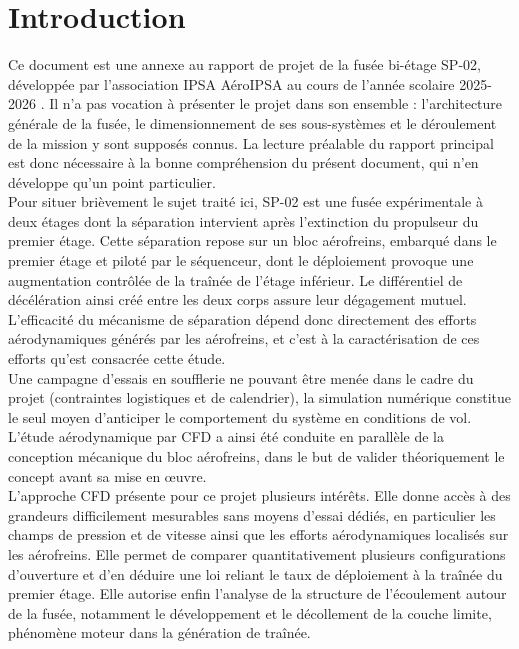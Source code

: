 \section*{Introduction}

Ce document est une annexe au rapport de projet de la fusée bi-étage SP-02, développée par l'association \acrshort{IPSA} AéroIPSA
au cours de l'année scolaire 2025-2026 \cite{rapportSP02}. Il n'a pas vocation à présenter le projet dans son ensemble :
l'architecture générale de la fusée, le dimensionnement de ses sous-systèmes et le déroulement de la mission y sont supposés
connus. La lecture préalable du rapport principal est donc nécessaire à la bonne compréhension du présent document, qui n'en
développe qu'un point particulier.\\

Pour situer brièvement le sujet traité ici, SP-02 est une fusée expérimentale à deux étages dont la séparation intervient après
l'extinction du propulseur du premier étage. Cette séparation repose sur un bloc aérofreins, embarqué dans le premier étage et
piloté par le séquenceur, dont le déploiement provoque une augmentation contrôlée de la traînée de l'étage inférieur. Le
différentiel de décélération ainsi créé entre les deux corps assure leur dégagement mutuel. L'efficacité du mécanisme de
séparation dépend donc directement des efforts aérodynamiques générés par les aérofreins, et c'est à la caractérisation de ces
efforts qu'est consacrée cette étude.\\

Une campagne d'essais en soufflerie ne pouvant être menée dans le cadre du projet (contraintes logistiques et de calendrier), la
simulation numérique constitue le seul moyen d'anticiper le comportement du système en conditions de vol. L'étude aérodynamique
par \acrfull{CFD} a ainsi été conduite en parallèle de la conception mécanique du bloc aérofreins, dans le but de valider
théoriquement le concept avant sa mise en \oe uvre.\\

L'approche \acrshort{CFD} présente pour ce projet plusieurs intérêts. Elle donne accès à des grandeurs difficilement mesurables
sans moyens d'essai dédiés, en particulier les champs de pression et de vitesse ainsi que les efforts aérodynamiques localisés sur
les aérofreins. Elle permet de comparer quantitativement plusieurs configurations d'ouverture et d'en déduire une loi reliant le
taux de déploiement à la traînée du premier étage. Elle autorise enfin l'analyse de la structure de l'écoulement autour de la
fusée, notamment le développement et le décollement de la couche limite, phénomène moteur dans la génération de traînée.\\

